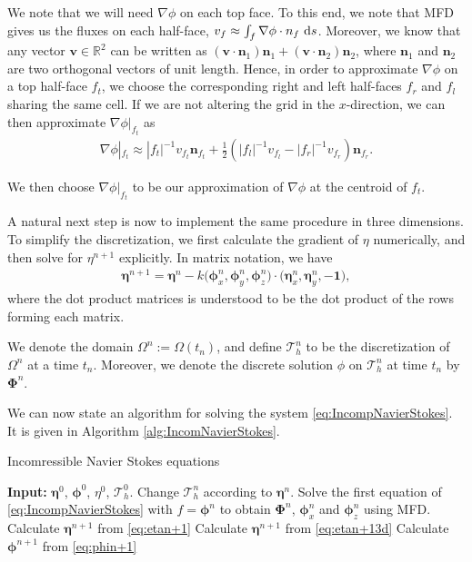 \documentclass[12pt]{article}
\begin{document}
We note that we will need $\nabla \phi$ on each top face. To this end, we note that MFD gives us the fluxes on each half-face, $v_{f} \approx \int_{f} \nabla \phi \cdot n_{f} \, \operatorname{d}\! s$.
Moreover, we know that any vector $\bm{v} \in \mathbb{R}^2$ can be written as $(\bm{v}\cdot\bm{n}_1) \bm{n}_1 + (\bm{v}\cdot\bm{n}_2) \bm{n}_2$,
where $\bm{n}_1$ and $\bm{n}_2$ are two orthogonal vectors of unit length.
Hence, in order to approximate $\nabla \phi$ on a top half-face $f_t$, we choose the corresponding right and left half-faces $f_r$ and $f_l$ sharing the same cell.
If we are not altering the grid in the $x$-direction, we can then approximate $\nabla \phi|_{f_t}$ as
\begin{align*}
    \nabla \phi|_{f_t} \approx |f_t|^{-1} v_{f_t} \bm{n}_{f_t} + \frac{1}{2}(|f_l|^{-1}v_{f_l}-|f_r|^{-1}v_{f_r})\bm{n}_{f_r}.
\end{align*}

We then choose $\nabla \phi|_{f_t}$ to be our approximation of $\nabla \phi$ at the centroid of $f_t$.

A natural next step is now to implement the same procedure in three dimensions. To simplify the discretization, we first calculate
the gradient of $\eta$ numerically, and then solve for $\eta^{n+1}$ explicitly. In matrix notation, we have
\begin{align}
    \label{eq:etan+13d}
    \bm{\eta}^{n+1} = \bm{\eta}^n - k \big(\bm{\phi}_x^n, \bm{\phi}_y^n, \bm{\phi}_z^n\big)\cdot(\bm{\eta}_x^n, \bm{\eta}_y^n, -\bm{1}\big),
\end{align}
where the dot product matrices is understood to be the dot product of the rows forming each matrix.

We denote the domain $\Omega^n := \Omega(t_n)$, and define $\mathcal{T}_h^n$ to be the discretization of $\Omega^n$
at a time $t_n$. Moreover, we denote the discrete solution $\phi$ on $\mathcal{T}_h^n$ at time $t_n$ by $\bm{\Phi}^n$.

We can now state an algorithm for solving the system \eqref{eq:IncompNavierStokes}. It is given in Algorithm \ref{alg:IncomNavierStokes}.
%
%
\begin{algorithm}
    \caption{Incomressible Navier Stokes equations}
    \begin{algorithmic}[1]
    \State    \textbf{Input:} $\bm{\eta}^0$, $\bm{\phi}^0$, $\eta^0$, $\mathcal{T}_h^0$.
	    \State    Change $\mathcal{T}_h^n$ according to $\bm{\eta}^n$.
            \State    Solve the first equation of \eqref{eq:IncompNavierStokes} with $f = \bm{\phi}^n$ to obtain
                      $\bm{\Phi}^{n}$, $\bm{\phi}_x^n$ and $\bm{\phi}_z^n$ using MFD.
                \State    Calculate $\bm{\eta}^{n+1}$ from \eqref{eq:etan+1}
			    \State    Calculate $\bm{\eta}^{n+1}$ from \eqref{eq:etan+13d}
			\EndIf
        \State    Calculate $\bm{\phi}^{n+1}$ from \eqref{eq:phin+1}
        \EndFor
	\end{algorithmic}
	\label{alg:IncomNavierStokes}
\end{algorithm}
\end{document}
